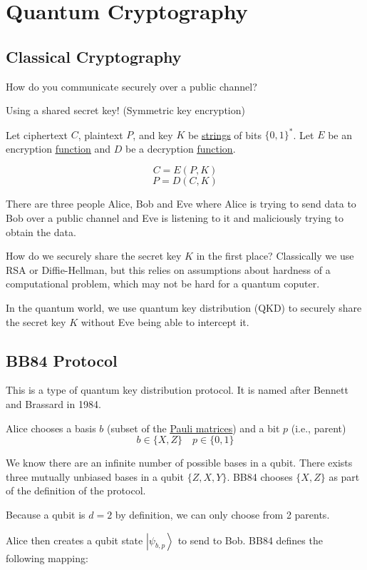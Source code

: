 \documentclass[
]{article}
\let\oldhyperref\hyperref
\renewcommand{\hyperref}[2][]{\oldhyperref[#1]{\underline{#2}}}
\providecommand{\ket}[1]{\left\lvert #1 \right\rangle}
\begin{document}
\section{Quantum Cryptography}\label{quantum-cryptography}

\subsection{Classical Cryptography}\label{classical-cryptography}
How do you communicate securely over a public channel?

Using a shared secret key! (Symmetric key encryption)

Let ciphertext $C$, plaintext $P$, and key $K$ be \hyperref[strings]{strings} of bits $\{0,1\}^*$.
Let $E$ be an encryption \hyperref[functions]{function} and $D$ be a decryption \hyperref[functions]{function}.

\[
	C=E(P, K)
\]
\[
	P=D(C, K)
\]

There are three people Alice, Bob and Eve where Alice is trying to send data to Bob over a public channel and Eve is listening to it and maliciously trying to obtain the data.

How do we securely share the secret key $K$ in the first place? Classically we use RSA or Diffie-Hellman, but this relies on
assumptions about hardness of a computational problem, which may not be hard for a quantum coputer.


In the quantum world, we use quantum key distribution (QKD) to securely share the secret key $K$ without Eve being able to intercept it.

\subsection{BB84 Protocol}\label{bb84-protocol}
This is a type of quantum key distribution protocol. It is named after Bennett and Brassard in 1984.

Alice chooses a basis $b$ (subset of the \hyperref[pauli-matrices]{Pauli matrices}) and a bit $p$ (i.e., parent)
\[
	b\in\{X,Z\}
	\quad
	p\in\{0,1\}
\]

We know there are an infinite number of possible bases in a qubit. There exists three mutually unbiased bases in a qubit $\{Z,X,Y\}$. BB84 chooses $\{X,Z\}$ as part of the definition of the protocol.

Because a qubit is $d=2$ by definition, we can only choose from 2 parents.

Alice then creates a qubit state $\ket{\psi_{b,p}}$ to send to Bob.
BB84 defines the following mapping:
\end{document}

